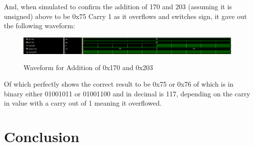 And, when simulated to confirm the addition of 170 and 203 (assuming it is unsigned) above to be 0x75 Carry 1 as it overflows and switches sign, it gave out the following waveform:
\begin{figure}[!htbp]
    \centering
    \caption{Waveform for Addition of 0x170 and 0x203}
    \includegraphics[width=1\textwidth]{part-2-waveform.png}
    \label{Waveform for Addition of 170 and 203}
\end{figure}
Of which perfectly shows the correct result to be 0x75 or 0x76 of which is in binary either 01001011 or 01001100 and in decimal is 117, depending on the carry in value with a carry out of 1 meaning it overflowed.
\newpage


\section{Conclusion}




